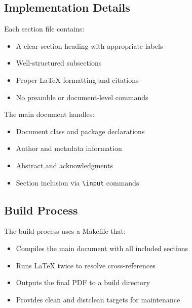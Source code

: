 \subsection{Implementation Details}

Each section file contains:
\begin{itemize}
    \item A clear section heading with appropriate labels
    \item Well-structured subsections
    \item Proper LaTeX formatting and citations
    \item No preamble or document-level commands
\end{itemize}

The main document handles:
\begin{itemize}
    \item Document class and package declarations
    \item Author and metadata information
    \item Abstract and acknowledgments
    \item Section inclusion via \texttt{\textbackslash input} commands
\end{itemize}

\subsection{Build Process}

The build process uses a Makefile that:
\begin{itemize}
    \item Compiles the main document with all included sections
    \item Runs LaTeX twice to resolve cross-references
    \item Outputs the final PDF to a build directory
    \item Provides clean and distclean targets for maintenance
\end{itemize} 